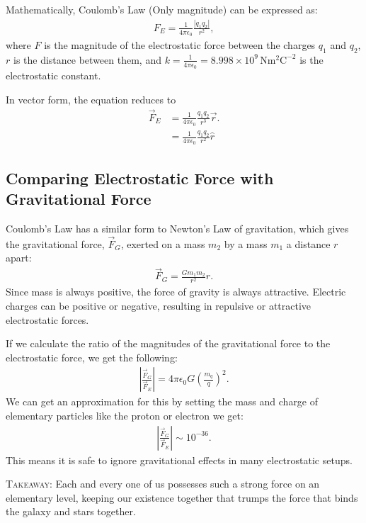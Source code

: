\documentclass[12pt,b4paper]{article}
\begin{document}
Mathematically, Coulomb's Law (Only magnitude) can be expressed as:
\begin{align}
    F_E = \frac{1}{4\pi\epsilon_0}\frac{|q_1q_2|}{r^2},
\end{align}
where $F$ is the magnitude of the electrostatic force between the charges $q_1$ and $q_2$, $r$ is the distance between them, and $\displaystyle k=\frac{1}{4\pi\epsilon_0}=8.998\times10^9\,\unit{\newton\meter\squared}\text{C}^{-2}$ is the electrostatic constant.

In vector form, the equation reduces to
\begin{align}
    \Vec{F}_E&=\frac{1}{4\pi\epsilon_0}\frac{q_1q_2}{r^3}\Vec{r}.\\
    &=\frac{1}{4\pi\epsilon_0}\frac{q_1q_2}{r^2}\hat{r}
\end{align}
\subsection*{Comparing Electrostatic Force with Gravitational Force}
Coulomb's Law has a similar form to Newton's Law of gravitation, which gives the gravitational force, $\vec{F}_G$, exerted on a mass $m_2$ by a mass $m_1$ a distance $r$ apart:
\begin{align}
    \vec{F}_G=\frac{Gm_1m_2}{r^2}\hat{r}.
\end{align}
Since mass is always positive, the force of gravity is always attractive. Electric charges can be positive or negative, resulting in repulsive or attractive electrostatic forces.

If we calculate the ratio of the magnitudes of the gravitational force to the electrostatic force, we get the following:
\begin{align}
    \left|\frac{\vec{F}_G}{\vec{F}_E}\right|=4\pi\epsilon_0G\left(\frac{m_q}{q}\right)^2.
\end{align}
We can get an approximation for this by setting the mass and charge of elementary particles like the proton or electron we get:
\begin{align}
    \left|\frac{\vec{F}_G}{\vec{F}_E}\right|\sim10^{-36}.
\end{align}
This means it is safe to ignore gravitational effects in many electrostatic setups.

\textsc{Takeaway}: Each and every one of us possesses such a strong force on an elementary level, keeping our existence together that trumps the force that binds the galaxy and stars together.
\end{document}
